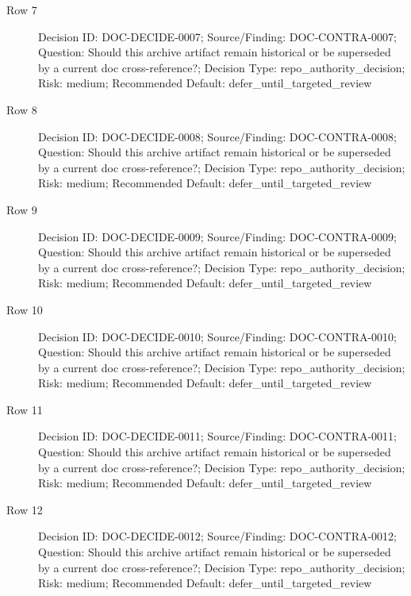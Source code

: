 \documentclass[10.5pt,a4paper,openany]{book}
\begin{document}
\begin{description}
\item[Row 7] Decision ID: DOC-\allowbreak{}DECIDE-\allowbreak{}0007; Source/\allowbreak{}Finding: DOC-\allowbreak{}CONTRA-\allowbreak{}0007; Question: Should this archive artifact remain historical or be superseded by a current doc cross-\allowbreak{}reference?; Decision Type: repo\_\allowbreak{}authority\_\allowbreak{}decision; Risk: medium; Recommended Default: defer\_\allowbreak{}until\_\allowbreak{}targeted\_\allowbreak{}review
\item[Row 8] Decision ID: DOC-\allowbreak{}DECIDE-\allowbreak{}0008; Source/\allowbreak{}Finding: DOC-\allowbreak{}CONTRA-\allowbreak{}0008; Question: Should this archive artifact remain historical or be superseded by a current doc cross-\allowbreak{}reference?; Decision Type: repo\_\allowbreak{}authority\_\allowbreak{}decision; Risk: medium; Recommended Default: defer\_\allowbreak{}until\_\allowbreak{}targeted\_\allowbreak{}review
\item[Row 9] Decision ID: DOC-\allowbreak{}DECIDE-\allowbreak{}0009; Source/\allowbreak{}Finding: DOC-\allowbreak{}CONTRA-\allowbreak{}0009; Question: Should this archive artifact remain historical or be superseded by a current doc cross-\allowbreak{}reference?; Decision Type: repo\_\allowbreak{}authority\_\allowbreak{}decision; Risk: medium; Recommended Default: defer\_\allowbreak{}until\_\allowbreak{}targeted\_\allowbreak{}review
\item[Row 10] Decision ID: DOC-\allowbreak{}DECIDE-\allowbreak{}0010; Source/\allowbreak{}Finding: DOC-\allowbreak{}CONTRA-\allowbreak{}0010; Question: Should this archive artifact remain historical or be superseded by a current doc cross-\allowbreak{}reference?; Decision Type: repo\_\allowbreak{}authority\_\allowbreak{}decision; Risk: medium; Recommended Default: defer\_\allowbreak{}until\_\allowbreak{}targeted\_\allowbreak{}review
\item[Row 11] Decision ID: DOC-\allowbreak{}DECIDE-\allowbreak{}0011; Source/\allowbreak{}Finding: DOC-\allowbreak{}CONTRA-\allowbreak{}0011; Question: Should this archive artifact remain historical or be superseded by a current doc cross-\allowbreak{}reference?; Decision Type: repo\_\allowbreak{}authority\_\allowbreak{}decision; Risk: medium; Recommended Default: defer\_\allowbreak{}until\_\allowbreak{}targeted\_\allowbreak{}review
\item[Row 12] Decision ID: DOC-\allowbreak{}DECIDE-\allowbreak{}0012; Source/\allowbreak{}Finding: DOC-\allowbreak{}CONTRA-\allowbreak{}0012; Question: Should this archive artifact remain historical or be superseded by a current doc cross-\allowbreak{}reference?; Decision Type: repo\_\allowbreak{}authority\_\allowbreak{}decision; Risk: medium; Recommended Default: defer\_\allowbreak{}until\_\allowbreak{}targeted\_\allowbreak{}review

\end{description}
\end{document}

